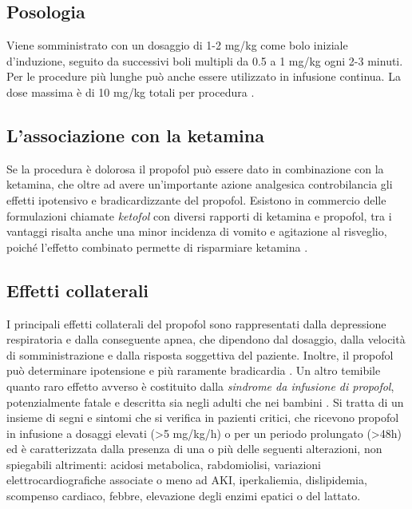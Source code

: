\subsection*{Posologia}

Viene somministrato con un dosaggio di 1-2 mg/kg come bolo iniziale d'induzione, seguito da successivi boli multipli da 0.5 a 1 mg/kg ogni 2-3 minuti. Per le procedure più lunghe può anche essere utilizzato in infusione continua.
La dose massima è di 10 mg/kg totali per procedura \cite{Simeupsedazione}.

\subsection*{L'associazione con la ketamina}

Se la procedura è dolorosa il propofol può essere dato in combinazione con la ketamina, che oltre ad avere un'importante azione analgesica controbilancia gli effetti ipotensivo e bradicardizzante del propofol. Esistono in commercio delle formulazioni chiamate \emph{ketofol} con diversi rapporti di ketamina e propofol, tra i vantaggi risalta anche una minor incidenza di vomito e agitazione al risveglio, poiché l'effetto combinato permette di risparmiare ketamina \cite{Simeupsedazione}.

\subsection*{Effetti collaterali}

I principali effetti collaterali del propofol sono rappresentati dalla depressione respiratoria e dalla conseguente apnea, che dipendono dal dosaggio, dalla velocità di somministrazione e dalla risposta soggettiva del paziente. Inoltre, il propofol può determinare ipotensione e più raramente bradicardia \cite{propofolsafety2010}.
Un altro temibile quanto raro effetto avverso è costituito dalla \emph{sindrome da infusione di propofol}, potenzialmente fatale e descritta sia negli adulti che nei bambini \cite{Propofolinfusionsyndrome2019}. Si tratta di un insieme di segni e sintomi che si verifica in pazienti critici, che ricevono propofol in infusione a dosaggi elevati (>5 mg/kg/h) o per un periodo prolungato (>48h) ed è caratterizzata dalla presenza di una o più delle seguenti alterazioni, non spiegabili altrimenti: acidosi metabolica, rabdomiolisi, variazioni elettrocardiografiche associate o meno ad AKI, iperkaliemia, dislipidemia, scompenso cardiaco, febbre, elevazione degli enzimi epatici o del lattato. 

